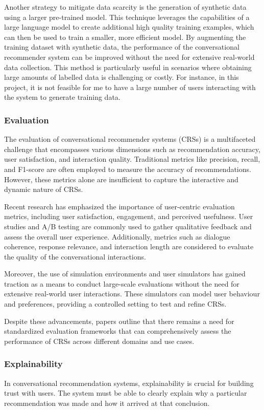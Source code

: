Another strategy to mitigate data scarcity is the generation of synthetic data using a larger pre-trained model. 
This technique leverages the capabilities of a large language model to create additional high quality training examples, 
which can then be used to train a smaller, more efficient model. 
By augmenting the training dataset with synthetic data, the performance of the conversational recommender system can be improved without the need for extensive real-world data collection. 
This method is particularly useful in scenarios where obtaining large amounts of labelled data is challenging or costly. 
For instance, in this project, it is not feasible for me to have a large number of users interacting with the system to generate training data.


\subsubsection{Evaluation}
The evaluation of conversational recommender systems (CRSs) is a multifaceted challenge that encompasses various dimensions such as recommendation accuracy, user satisfaction, and interaction quality. Traditional metrics like precision, recall, and F1-score are often employed to measure the accuracy of recommendations. However, these metrics alone are insufficient to capture the interactive and dynamic nature of CRSs.

Recent research has emphasized the importance of user-centric evaluation metrics, including user satisfaction, engagement, and perceived usefulness. User studies and A/B testing are commonly used to gather qualitative feedback and assess the overall user experience. Additionally, metrics such as dialogue coherence, response relevance, and interaction length are considered to evaluate the quality of the conversational interactions.

Moreover, the use of simulation environments and user simulators has gained traction\cite{huang2024conceptevaluationprotocol} as a means to conduct large-scale evaluations without the need for extensive real-world user interactions. These simulators can model user behaviour and preferences, providing a controlled setting to test and refine CRSs.

Despite these advancements, papers outline that there remains a need for standardized evaluation frameworks that can comprehensively assess the performance of CRSs across different domains and use cases.

\subsubsection{Explainability}
In conversational recommendation systems, explainability is crucial for building trust with users. The system must be able to clearly explain why a particular recommendation was made and how it arrived at that conclusion. 


